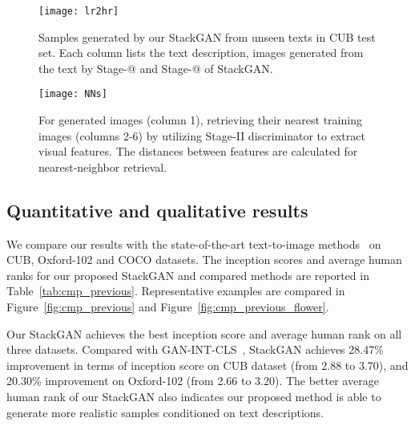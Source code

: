 \documentclass[10pt,twocolumn,letterpaper]{article}
\makeatletter
\newcommand{\Rmnum}[1]{\expandafter\@slowromancap\romannumeral #1@}
\makeatother
\begin{document}
\begin{figure*}[bt]
\begin{center}
	\texttt{[image: lr2hr]}
\end{center}
\vspace{-8pt}
   \caption{Samples generated by our StackGAN from unseen texts in CUB test set. 
   Each column lists the text description, images generated from the text by Stage-\Rmnum{1} and Stage-\Rmnum{2} of StackGAN.}
\vspace{-10pt}
\label{fig:lr2hr}
\end{figure*}


\begin{figure}[bt]
\begin{center}
	\texttt{[image: NNs]}
\end{center}
\vspace{-8pt}
   \caption{For generated images (column 1), retrieving their nearest training images (columns 2-6) by utilizing Stage-II discriminator  to extract visual features. The  distances between features are calculated for nearest-neighbor retrieval.}
\vspace{-10pt}
\label{fig:NNs}
\end{figure}


\vspace{-2pt}
\subsection{Quantitative and qualitative results}
\vspace{-5pt}

We compare our results with the state-of-the-art text-to-image methods~\cite{reed2016learning, reed2016generative} on CUB, Oxford-102 and COCO datasets. The inception scores and average human ranks for our proposed StackGAN and compared methods are reported in Table~\ref{tab:cmp_previous}. Representative examples are compared in Figure~\ref{fig:cmp_previous} and Figure~\ref{fig:cmp_previous_flower}.

Our StackGAN achieves the best inception score and average human rank on all three datasets. Compared with GAN-INT-CLS~\cite{reed2016generative}, StackGAN achieves 28.47\% improvement in terms of inception score on CUB dataset (from 2.88 to 3.70), and 20.30\% improvement on Oxford-102 (from 2.66 to 3.20). The better average human rank of our StackGAN also indicates our proposed method is able to generate more realistic samples conditioned on text descriptions.
\end{document}
